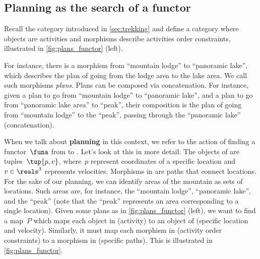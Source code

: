 

\subsection{Planning as the search of a functor}

\begin{example}
	\label{ex:planning-as-search-functor}
	Recall the category \Berg introduced in \cref{sec:trekking} and define a category \Plans where objects are activities and morphisms describe activities order constraints, illustrated in \cref{fig:plans_functor} (left).

	For instance, there is a morphism from ``mountain lodge'' to ``panoramic lake'', which describes the plan of going from the lodge area to the lake area.
	We call such morphisms \emph{plans}.
	Plans can be composed via concatenation.
	For instance, given a plan to go from ``mountain lodge'' to ``panoramic lake'', and a plan to go from ``panoramic lake area'' to ``peak'', their composition is the plan of going from ``mountain lodge'' to the ``peak'', passing through the ``panoramic lake'' (concatenation).

	When we talk about \textbf{planning} in this context, we refer to the action of finding a functor~$\funa$ from \Plans to \Berg.
	Let's look at this in more detail.
	The objects of \Berg are tuples~$\tup{p,v}$, where~$p$ represent coordinates of a specific location and~$v\in \reals^3$ represents velocities.
	Morphisms in \Berg are paths that connect locations.
	For the sake of our planning, we can identify areas of the mountain as sets of locations.
	Such areas are, for instance, the ``mountain lodge'', ``panoramic lake'', and the
	``peak'' (note that the ``peak'' represents an area corresponding to a single location).
	Given some plans as in \cref{fig:plans_functor} (left), we want to find a map~$P$ which maps each object in \Plans (activity) to an object of \Berg (specific location and velocity).
	Similarly, it must map each morphism in \Plans (activity order constraints) to a morphism in \Berg (specific paths).
	This is illustrated in \cref{fig:plans_functor}.
\end{example}

